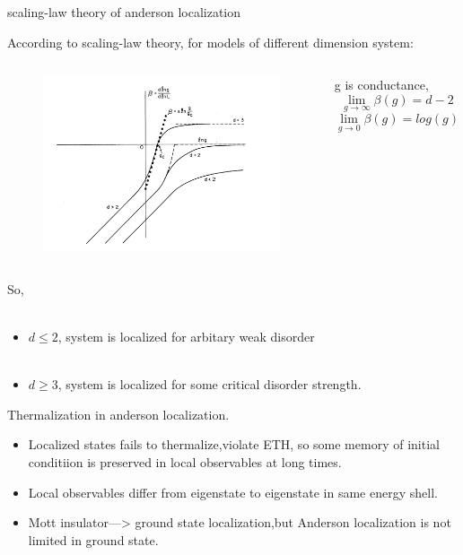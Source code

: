 \documentclass{beamer}
\begin{document}
\begin{frame}{scaling-law theory of anderson localization}

According to scaling-law theory, for models of different dimension system:
\begin{columns}
\begin{figure}
\includegraphics[width=1\linewidth]{scaling}
\end{figure}
g is conductance, 
$$\lim_{g\to\infty}\beta(g)=d-2$$
$$\lim_{g\to0}\beta(g)=log(g)$$

\end{columns}
\end{frame}

\begin{frame}
So, \\~
\begin{itemize}

\item $d\leqslant 2$, system is localized for arbitary weak disorder\\~

\item $d\geqslant 3$, system is localized for some critical disorder strength.
\end{itemize}

\end{frame}


\begin{frame}
Thermalization in anderson localization.

\begin{itemize}

\item Localized states fails to thermalize,violate ETH, so some memory of initial conditiion is preserved in local observables at long times. 

\pause \item Local observables differ from eigenstate to eigenstate in same energy shell. 

\pause \item Mott insulator—> ground state localization,but Anderson localization is not limited in ground state.

\end{itemize}

\end{frame}
\end{document}

